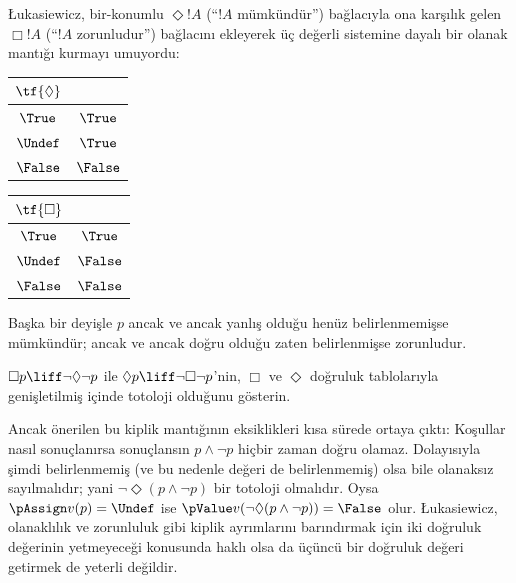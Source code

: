 \documentclass[../../../include/open-logic-section]{subfiles}
\begin{document}
\L ukasiewicz, bir-konumlu $\Diamond !A$ (“$!A$ mümkündür”) bağlacıyla ona
karşılık gelen $\Box !A$ (“$!A$ zorunludur”) bağlacını ekleyerek üç değerli
sistemine dayalı bir olanak mantığı kurmayı umuyordu:
\begin{center}
  \begin{tabular}{c|c} 
    $\tf{\Diamond}$ & \\ 
    \hline  
    $\True$ & $\True$ \\ 
    $\Undef$ & $\True$ \\
    $\False$ & $\False$ 
  \end{tabular}
  \quad
  \begin{tabular}{c|c} 
    $\tf{\Box}$ & \\ 
    \hline  
    $\True$ & $\True$ \\ 
    $\Undef$ & $\False$ \\
    $\False$ & $\False$ 
  \end{tabular}
\end{center}
Başka bir deyişle $p$ ancak ve ancak yanlış olduğu henüz belirlenmemişse
mümkündür; ancak ve ancak doğru olduğu zaten belirlenmişse zorunludur.

\begin{prob}
  $\Box p \liff \lnot\Diamond \lnot p$ ile $\Diamond p \liff
  \lnot \Box \lnot p$'nin, $\Box$ ve $\Diamond$ doğruluk tablolarıyla
  genişletilmiş \LogLuk[3] içinde totoloji olduğunu gösterin.
\end{prob}

Ancak önerilen bu kiplik mantığının eksiklikleri kısa sürede ortaya çıktı:
Koşullar nasıl sonuçlanırsa sonuçlansın $p \land \lnot p$ hiçbir zaman doğru
olamaz. Dolayısıyla şimdi belirlenmemiş (ve bu nedenle değeri de
belirlenmemiş) olsa bile olanaksız sayılmalıdır; yani
$\lnot \Diamond(p \land \lnot p)$ bir totoloji olmalıdır. Oysa
$\pAssign v(p) = \Undef$ ise
$\pValue v(\lnot \Diamond(p \land \lnot p)) = \False$ olur.
\L ukasiewicz, olanaklılık ve zorunluluk gibi kiplik ayrımlarını barındırmak
için iki doğruluk değerinin yetmeyeceği konusunda haklı olsa da üçüncü bir
doğruluk değeri getirmek de yeterli değildir.
\end{document}
